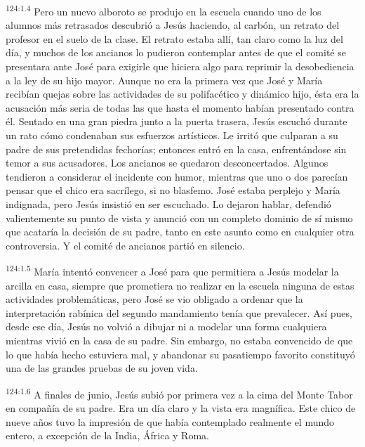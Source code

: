 \par
\textsuperscript{124:1.4} Pero un nuevo alboroto se produjo en la escuela cuando uno de los alumnos más retrasados descubrió a Jesús haciendo, al carbón, un retrato del profesor en el suelo de la clase. El retrato estaba allí, tan claro como la luz del día, y muchos de los ancianos lo pudieron contemplar antes de que el comité se presentara ante José para exigirle que hiciera algo para reprimir la desobediencia a la ley de su hijo mayor. Aunque no era la primera vez que José y María recibían quejas sobre las actividades de su polifacético y dinámico hijo, ésta era la acusación más seria de todas las que hasta el momento habían presentado contra él. Sentado en una gran piedra junto a la puerta trasera, Jesús escuchó durante un rato cómo condenaban sus esfuerzos artísticos. Le irritó que culparan a su padre de sus pretendidas fechorías; entonces entró en la casa, enfrentándose sin temor a sus acusadores. Los ancianos se quedaron desconcertados. Algunos tendieron a considerar el incidente con humor, mientras que uno o dos parecían pensar que el chico era sacrílego, si no blasfemo. José estaba perplejo y María indignada, pero Jesús insistió en ser escuchado. Lo dejaron hablar, defendió valientemente su punto de vista y anunció con un completo dominio de sí mismo que acataría la decisión de su padre, tanto en este asunto como en cualquier otra controversia. Y el comité de ancianos partió en silencio.

\par
\textsuperscript{124:1.5} María intentó convencer a José para que permitiera a Jesús modelar la arcilla en casa, siempre que prometiera no realizar en la escuela ninguna de estas actividades problemáticas, pero José se vio obligado a ordenar que la interpretación rabínica del segundo mandamiento tenía que prevalecer. Así pues, desde ese día, Jesús no volvió a dibujar ni a modelar una forma cualquiera mientras vivió en la casa de su padre. Sin embargo, no estaba convencido de que lo que había hecho estuviera mal, y abandonar su pasatiempo favorito constituyó una de las grandes pruebas de su joven vida.

\par
\textsuperscript{124:1.6} A finales de junio, Jesús subió por primera vez a la cima del Monte Tabor en compañía de su padre. Era un día claro y la vista era magnífica. Este chico de nueve años tuvo la impresión de que había contemplado realmente el mundo entero, a excepción de la India, África y Roma.

